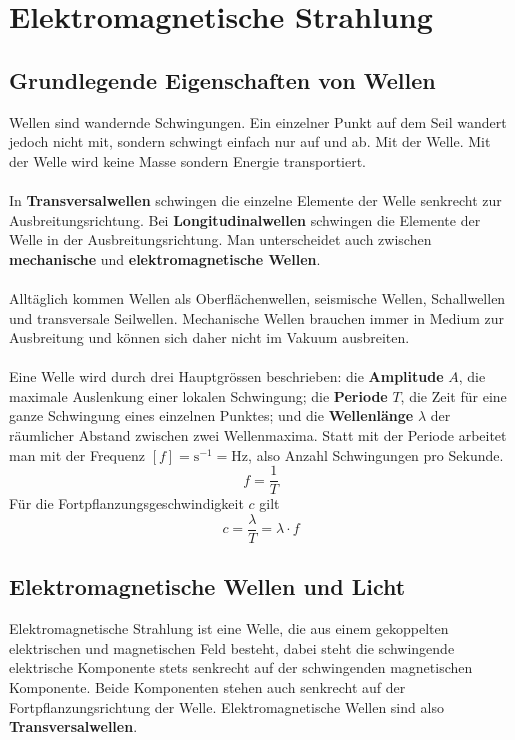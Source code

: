 \section{Elektromagnetische Strahlung}
\subsection{Grundlegende Eigenschaften von Wellen}
Wellen sind wandernde Schwingungen. Ein einzelner Punkt auf dem Seil wandert jedoch nicht mit, sondern schwingt einfach nur auf und ab. Mit der Welle. Mit der Welle wird keine Masse sondern Energie transportiert.
\\\\
In \textbf{Transversalwellen} schwingen die einzelne Elemente der Welle senkrecht zur Ausbreitungsrichtung. Bei \textbf{Longitudinalwellen} schwingen die Elemente der Welle in der Ausbreitungsrichtung. Man unterscheidet auch zwischen \textbf{mechanische} und \textbf{elektromagnetische Wellen}.
\\\\
Alltäglich kommen Wellen als Oberflächenwellen, seismische Wellen, Schallwellen und transversale Seilwellen. Mechanische Wellen brauchen immer in Medium zur Ausbreitung und können sich daher nicht im Vakuum ausbreiten. 
\\\\
Eine Welle wird durch drei Hauptgrössen beschrieben: die \textbf{Amplitude} $A$, die maximale Auslenkung einer lokalen Schwingung; die \textbf{Periode} $T$, die Zeit für eine ganze Schwingung eines einzelnen Punktes; und die \textbf{Wellenlänge} $\lambda$ der räumlicher Abstand zwischen zwei Wellenmaxima. Statt mit der Periode arbeitet man mit der Frequenz $[f]=\text{s}^{-1}=\text{Hz}$, also Anzahl Schwingungen pro Sekunde.
\begin{equation}
\boxed{f=\dfrac{1}{T}}
\end{equation}
Für die Fortpflanzungsgeschwindigkeit $c$ gilt
\begin{equation}
\boxed{c=\dfrac{\lambda}{T}=\lambda\cdot f}
\end{equation}
\subsection{Elektromagnetische Wellen und Licht}
Elektromagnetische Strahlung ist eine Welle, die aus einem gekoppelten elektrischen und magnetischen Feld besteht, dabei steht die schwingende elektrische Komponente stets senkrecht auf der schwingenden magnetischen Komponente. Beide Komponenten stehen auch senkrecht auf der Fortpflanzungsrichtung der Welle. Elektromagnetische Wellen sind also \textbf{Transversalwellen}.
